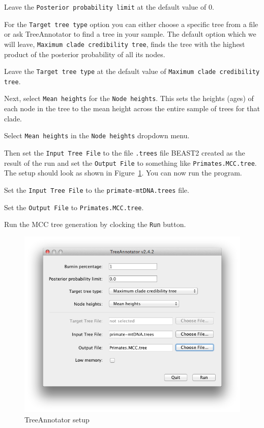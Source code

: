 \documentclass[11pt]{article}
\begin{document}
\begin{framed}
Leave the \texttt{Posterior probability limit} at the default value of 0.
\end{framed}

For the \texttt{Target tree type} option you can either choose a specific tree from a file or ask TreeAnnotator to find a tree in your sample. The default option which we will leave, \texttt{Maximum clade credibility tree}, finds the tree with the highest product of the posterior probability of all its nodes.

\begin{framed}
Leave the \texttt{Target tree type} at the default value of \texttt{Maximum clade credibility tree}.
\end{framed}

Next, select \texttt{Mean heights} for the \texttt{Node heights}. This sets the heights (ages) of each node in the tree to the mean height across the entire sample of trees for that clade.

\begin{framed}
Select \texttt{Mean heights} in the \texttt{Node heights} dropdown menu.
\end{framed}

Then set the \texttt{Input Tree File} to the file \texttt{.trees} file BEAST2 created as the result of the run and set the \texttt{Output File} to something like \texttt{Primates.MCC.tree}. The setup should look as shown in Figure~\ref{fig:treeannot}. You can now run the program.

\begin{framed}
Set the \texttt{Input Tree File} to the \texttt{primate-mtDNA.trees} file.

Set the \texttt{Output File} to \texttt{Primates.MCC.tree}.

Run the MCC tree generation by clocking the \texttt{Run} button.
\end{framed}

\begin{figure}[H]
\centering
\includegraphics[width=5in]{figures/treeannot.png}
\caption{\small TreeAnnotator setup}
\label{fig:treeannot}
\end{figure}
\end{document}

